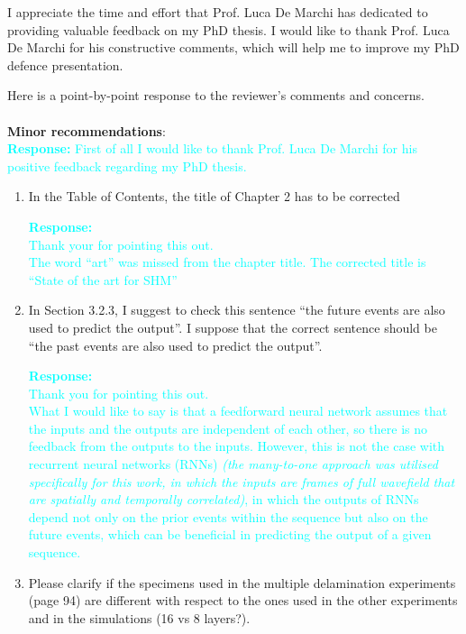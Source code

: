 \documentclass[11pt,a2paper]{report}
\begin{document}
	
	\noindent I appreciate the time and effort that Prof. Luca De Marchi has dedicated to providing valuable feedback on my PhD thesis. 
	I would like to thank Prof. Luca De Marchi for his constructive comments, which will help me to improve my PhD defence presentation. 

	\noindent Here is a point-by-point response to the reviewer’s comments and concerns.
	\\ \\
	\textbf{Minor recommendations}: \\
	\textcolor{Cyan}{
		\newline\textbf{Response:}
	First of all I would like to thank Prof. Luca De Marchi for his positive feedback regarding my PhD thesis.
	}
	\begin{enumerate}
		\item In the Table of Contents, the title of Chapter 2 has to be corrected
		
		\textcolor{Cyan}{
			\textbf{Response:}
			\\
			Thank your for pointing this out. \\
			The word \enquote{art} was missed from the chapter title. The corrected title is \enquote{State of the art for SHM}
			}				
		\item In Section 3.2.3, I suggest to check this sentence “the future events are also used to
		predict the output”. I suppose that the correct sentence should be “the past events are
		also used to predict the output”.
		
		\textcolor{Cyan}{
			\textbf{Response:\\}
			Thank you for pointing this out. \\
			What I would like to say is that a feedforward neural network assumes that the inputs and the outputs are independent of each other, so there is no feedback from the outputs to the inputs.
			However, this is not the case with recurrent neural networks (RNNs) \emph{(the many-to-one approach was utilised specifically for this work, in which the inputs are frames of full wavefield that are spatially and temporally correlated)}, in which the outputs of RNNs depend not only on the prior events within the sequence but also on the future events, which can be beneficial in predicting the output of a given sequence.
		}
		
		\item Please clarify if the specimens used in the multiple delamination experiments (page 94)
		are different with respect to the ones used in the other experiments and in the simulations (16 vs 8 layers?).
		

\end{enumerate}
\end{document}
